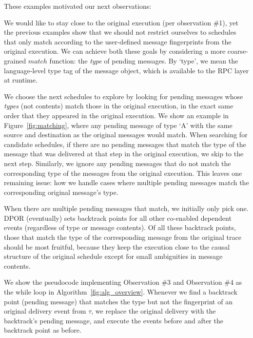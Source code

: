 These examples motivated our next observations:

 We would like to
stay close to the original execution (per observation \#1), yet the previous
examples show that we should not restrict ourselves to schedules that only
match according to the user-defined message fingerprints from the original execution. We
can achieve both these goals by considering a more coarse-grained $match$
function: the {\em type} of pending messages. By `type', we mean the
language-level type tag of the message object, which is
available to the RPC layer at runtime. %

We choose the next schedules to explore by looking for pending messages whose
{\em types} (not contents) match those in the original execution, in the exact same order
that they appeared in the original execution. We show an example in
Figure~\ref{fig:matching}, where any pending message of type `A' with the same
source and destination as the original messages would match. When searching for candidate schedules, if there
are no pending messages that match the type of the message that was delivered
at that step in the original execution, we skip to the next step.
Similarly, we
ignore any pending messages that do not match the corresponding type of the
messages from the original
execution. This leaves one remaining issue: how we handle cases where multiple
pending messages match the corresponding original message's type.

 When there are multiple pending messages that match,
we initially only pick one. DPOR (eventually) sets backtrack points for all other co-enabled
dependent events (regardless of type or message contents).
Of all these backtrack points, those that match the type of the corresponding message
from the original trace should be most fruitful, because they keep the execution close to the causal structure of the
original schedule except for small ambiguities in message contents.


We show the pseudocode implementing Observation \#3 and Observation \#4 as the while loop in Algorithm~\ref{fig:alg_overview}.
Whenever we find a backtrack point (pending message) that matches the type but not the
fingerprint of an original delivery event from $\tau$, we replace the original
delivery with the backtrack's pending message, and execute the events before
and after the backtrack point as before. %

